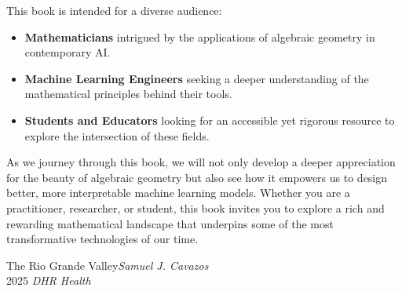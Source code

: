 This book is intended for a diverse audience:
\begin{itemize}
    \item \textbf{Mathematicians} intrigued by the applications of algebraic geometry in contemporary AI.
    \item \textbf{Machine Learning Engineers} seeking a deeper understanding of the mathematical principles behind their tools.
    \item \textbf{Students and Educators} looking for an accessible yet rigorous resource to explore the intersection of these fields.
\end{itemize}

As we journey through this book, we will not only develop a deeper appreciation for the beauty of algebraic geometry but also see how it empowers us to design better, more interpretable machine learning models. Whether you are a practitioner, researcher, or student, this book invites you to explore a rich and rewarding mathematical landscape that underpins some of the most transformative technologies of our time.

\vspace{\baselineskip}
\begin{flushright}\noindent
The Rio Grande Valley\hfill {\it Samuel J. Cavazos}\\
2025 \hfill {\it DHR Health}\\
\end{flushright}


